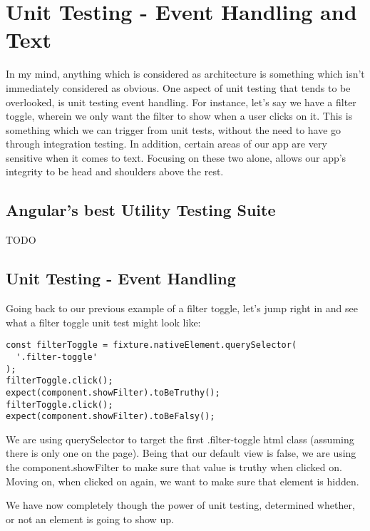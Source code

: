 \maketitle{}
\section{ Unit Testing - Event Handling and Text}
In my mind, anything which is considered as architecture is something which
isn't immediately considered as obvious. One aspect of unit testing that tends
to be overlooked, is unit testing event handling. For instance, let's say we
have a filter toggle, wherein we only want the filter to show when a user clicks
on it. This is something which we can trigger from unit tests, without the need
to have go through integration testing. In addition, certain areas of our app
are very sensitive when it comes to text. Focusing on these two alone, allows
our app's integrity to be head and shoulders above the rest.

\subsection{ Angular's best Utility Testing Suite }

TODO

\subsection{ Unit Testing - Event Handling }
Going back to our previous example of a filter toggle, let's jump right in and
see what a filter toggle unit test might look like:

\begin{lstlisting}
const filterToggle = fixture.nativeElement.querySelector(
  '.filter-toggle'
);
filterToggle.click();
expect(component.showFilter).toBeTruthy();
filterToggle.click();
expect(component.showFilter).toBeFalsy();
\end{lstlisting}

We are using querySelector to target the first .filter-toggle html class
(assuming there is only one on the page). Being that our default view is false,
we are using the component.showFilter to make sure that value is truthy when
clicked on. Moving on, when clicked on again, we want to make sure that element
is hidden. 

We have now completely though the power of unit testing, determined whether, or
not an element is going to show up.

